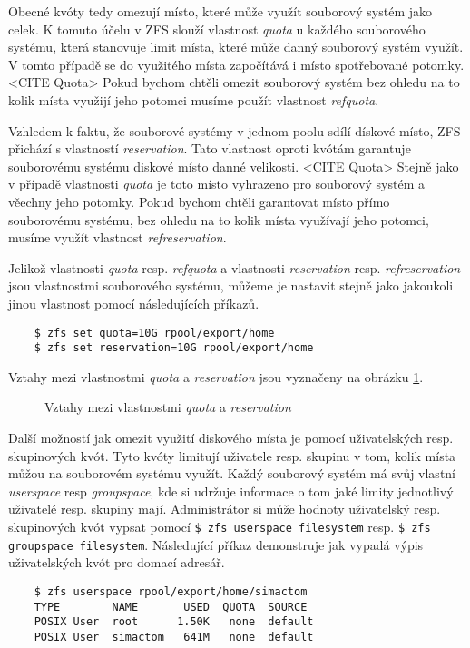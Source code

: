     Obecné kvóty tedy omezují místo, které může využít souborový systém jako celek. K tomuto účelu v ZFS slouží vlastnost \emph{quota} u každého souborového systému, která stanovuje limit místa, které může danný souborový systém využít. V tomto případě se do využitého místa započítává i místo spotřebované potomky. <CITE Quota> Pokud bychom chtěli omezit souborový systém bez ohledu na to kolik místa využijí jeho potomci musíme použít vlastnost \emph{refquota}.

    Vzhledem k faktu, že souborové systémy v jednom poolu sdílí dískové místo, ZFS přichází s vlastností \emph{reservation}. Tato vlastnost oproti kvótám garantuje souborovému systému diskové místo danné velikosti. <CITE Quota> Stejně jako v případě vlastnosti \emph{quota} je toto místo vyhrazeno pro souborový systém a věechny jeho potomky. Pokud bychom chtěli garantovat místo přímo souborovému systému, bez ohledu na to kolik místa využívají jeho potomci, musíme využít vlastnost \emph{refreservation}.

    Jelikož vlastnosti \emph{quota} resp. \emph{refquota} a vlastnosti \emph{reservation} resp. \emph{refreservation} jsou vlastnostmi souborového systému, můžeme je nastavit stejně jako jakoukoli jinou vlastnost pomocí následujících příkazů.
    \begin{verbatim}
    $ zfs set quota=10G rpool/export/home
    $ zfs set reservation=10G rpool/export/home
    \end{verbatim}

    Vztahy mezi vlastnostmi \emph{quota} a \emph{reservation} jsou vyznačeny na obrázku \ref{quotavsreserv}.
    \begin{figure}[h]
        \caption{Vztahy mezi vlastnostmi \emph{quota} a \emph{reservation}}
        \label{quotavsreserv}
    \end{figure}

    Další možností jak omezit využití diskového místa je pomocí uživatelských resp. skupinových kvót. Tyto kvóty limitují uživatele resp. skupinu v tom, kolik místa můžou na souborovém systému využít. Každý souborový systém má svůj vlastní \emph{userspace} resp \emph{groupspace}, kde si udržuje informace o tom jaké limity jednotlivý uživatelé resp. skupiny mají.
    Administrátor si může hodnoty uživatelský resp. skupinových kvót vypsat pomocí \verb|$ zfs userspace filesystem| resp. \verb|$ zfs groupspace filesystem|. Následující příkaz demonstruje jak vypadá výpis uživatelských kvót pro domací adresář.
    \begin{verbatim}
    $ zfs userspace rpool/export/home/simactom
    TYPE        NAME       USED  QUOTA  SOURCE
    POSIX User  root      1.50K   none  default
    POSIX User  simactom   641M   none  default
    \end{verbatim}

